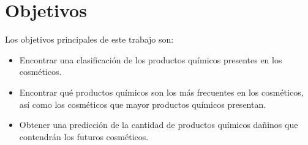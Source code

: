 \section{Objetivos}
Los objetivos principales de este trabajo son:
\begin{itemize}
 \item Encontrar una clasificación de los productos químicos presentes en los cosméticos.
 \item Encontrar qué productos químicos son los más frecuentes en los cosméticos, así como los cosméticos que mayor productos químicos presentan.
 \item Obtener una predicción de la cantidad de productos químicos dañinos que contendrán los futuros cosméticos.
\end{itemize}
























